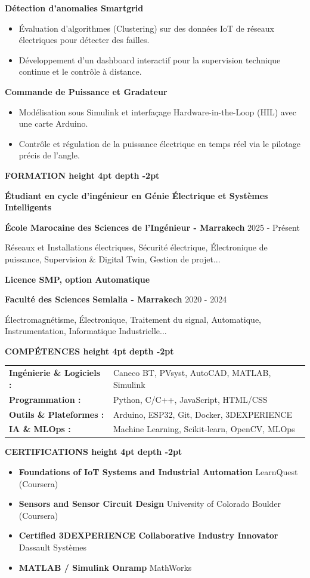 \documentclass[10pt,a4paper]{../../altacv}
\renewcommand{\cvsection}[2][]{%
  \medskip%
  {\color{heading}\LARGE\bfseries #2 \hspace{0.2em}\leaders\vrule height 4pt depth -2pt\hfill\mbox{}}\par\smallskip
}
\renewcommand{\cvevent}[4]{%
  {\large\bfseries\color{accent}#1\par}
  \smallskip\normalsize
  \ifstrequal{#2}{}{}{%
    \textbf{\color{emphasis}#2\ifstrequal{#4}{}{}{ - #4}}%
  }%
  \hfill
  \ifstrequal{#3}{}{}{{\small#3}}%
  \par\smallskip
}
\begin{document}
{\large\bfseries\color{accent} Détection d'anomalies Smartgrid}\\[0.05cm]
\begin{itemize}
  \item Évaluation d'algorithmes (Clustering) sur des données IoT de réseaux électriques pour détecter des failles.
  \item Développement d'un dashboard interactif pour la supervision technique continue et le contrôle à distance.
\end{itemize}

{\large\bfseries\color{accent} Commande de Puissance et Gradateur}\\[0.05cm]
\begin{itemize}
  \item Modélisation sous Simulink et interfaçage Hardware-in-the-Loop (HIL) avec une carte Arduino.
  \item Contrôle et régulation de la puissance électrique en temps réel via le pilotage précis de l'angle.
\end{itemize}

\cvsection{FORMATION}
\cvevent{Étudiant en cycle d'ingénieur en Génie Électrique et Systèmes Intelligents}{École Marocaine des Sciences de l'Ingénieur}{2025 - Présent}{Marrakech}
\small Réseaux et Installations électriques, Sécurité électrique, Électronique de puissance, Supervision \& Digital Twin, Gestion de projet...

\cvevent{Licence SMP, option Automatique}{Faculté des Sciences Semlalia}{2020 - 2024}{Marrakech}
\small Électromagnétisme, Électronique, Traitement du signal, Automatique, Instrumentation, Informatique Industrielle...

\cvsection{COMPÉTENCES}
\begin{tabular}{@{}ll@{}}
\textbf{Ingénierie \& Logiciels :} & Caneco BT, PVsyst, AutoCAD, MATLAB, Simulink \\[1pt]
\textbf{Programmation :} & Python, C/C++, JavaScript, HTML/CSS \\[1pt]
\textbf{Outils \& Plateformes :} & Arduino, ESP32, Git, Docker, 3DEXPERIENCE \\[1pt]
\textbf{IA \& MLOps :} & Machine Learning, Scikit-learn, OpenCV, MLOps \\
\end{tabular}

\cvsection{CERTIFICATIONS}
\begin{itemize}[leftmargin=*, label=\textbullet, itemsep=2pt]
  \item \textbf{Foundations of IoT Systems and Industrial Automation} \hfill {\color{emphasis}LearnQuest (Coursera)}
  \item \textbf{Sensors and Sensor Circuit Design} \hfill {\color{emphasis}University of Colorado Boulder (Coursera)}
  \item \textbf{Certified 3DEXPERIENCE Collaborative Industry Innovator} \hfill {\color{emphasis}Dassault Systèmes}
  \item \textbf{MATLAB / Simulink Onramp} \hfill {\color{emphasis}MathWorks}
\end{itemize}
\end{document}
